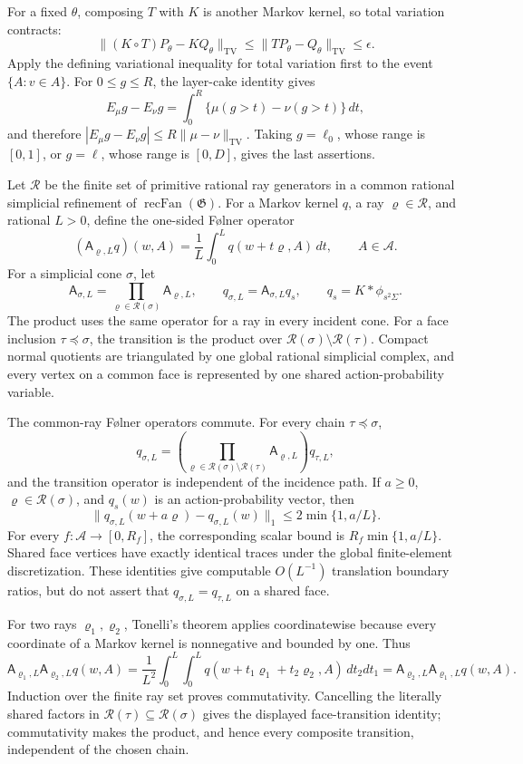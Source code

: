 For a fixed \(\theta\), composing \(T\) with \(K\) is another Markov kernel, so total variation contracts:
\[
 \|(K\circ T)P_\theta-KQ_\theta\|_{\mathrm{TV}}
 \le \|TP_\theta-Q_\theta\|_{\mathrm{TV}}\le\epsilon.
\]
Apply the defining variational inequality for total variation first to the event \(\{A:v\in A\}\). For \(0\le g\le R\), the layer-cake identity gives
\[
 E_\mu g-E_\nu g
 =\int_0^R\{\mu(g>t)-\nu(g>t)\}\,dt,
\]
and therefore \(|E_\mu g-E_\nu g|\le R\|\mu-\nu\|_{\mathrm{TV}}\). Taking \(g=\ell_0\), whose range is \([0,1]\), or \(g=\ell\), whose range is \([0,D]\), gives the last assertions.

Let \(\mathscr R\) be the finite set of primitive rational ray generators in a common rational simplicial refinement of \(\operatorname{recFan}(\mathfrak G)\). For a Markov kernel \(q\), a ray \(\varrho\in\mathscr R\), and rational \(L>0\), define the one-sided Følner operator
\[
 (\mathsf A_{\varrho,L}q)(w,A)
 =\frac1L\int_0^Lq(w+t\varrho,A)\,dt,
 \qquad A\in\mathcal A.
\]
For a simplicial cone \(\sigma\), let
\[
 \mathsf A_{\sigma,L}=\prod_{\varrho\in\mathscr R(\sigma)}
 \mathsf A_{\varrho,L},
 \qquad q_{\sigma,L}=\mathsf A_{\sigma,L}q_s,
 \qquad q_s=K*\phi_{s^2\Sigma}.
\]
The product uses the same operator for a ray in every incident cone. For a face inclusion \(\tau\preceq\sigma\), the transition is the product over \(\mathscr R(\sigma)\setminus\mathscr R(\tau)\). Compact normal quotients are triangulated by one global rational simplicial complex, and every vertex on a common face is represented by one shared action-probability variable.

The common-ray Følner operators commute. For every chain \(\tau\preceq\sigma\),
\[
 q_{\sigma,L}
 =\left(\prod_{\varrho\in\mathscr R(\sigma)\setminus\mathscr R(\tau)}
 \mathsf A_{\varrho,L}\right)q_{\tau,L},
\]
and the transition operator is independent of the incidence path. If \(a\ge0\), \(\varrho\in\mathscr R(\sigma)\), and \(q_s(w)\) is an action-probability vector, then
\[
 \|q_{\sigma,L}(w+a\varrho)-q_{\sigma,L}(w)\|_1
 \le 2\min\{1,a/L\}.
\]
For every \(f:\mathcal A\to[0,R_f]\), the corresponding scalar bound is \(R_f\min\{1,a/L\}\). Shared face vertices have exactly identical traces under the global finite-element discretization. These identities give computable \(O(L^{-1})\) translation boundary ratios, but do not assert that \(q_{\sigma,L}=q_{\tau,L}\) on a shared face.

For two rays \(\varrho_1,\varrho_2\), Tonelli's theorem applies coordinatewise because every coordinate of a Markov kernel is nonnegative and bounded by one. Thus
\[
 \mathsf A_{\varrho_1,L}\mathsf A_{\varrho_2,L}q(w,A)
 =\frac1{L^2}\int_0^L\int_0^L
 q(w+t_1\varrho_1+t_2\varrho_2,A)\,dt_2dt_1
 =\mathsf A_{\varrho_2,L}\mathsf A_{\varrho_1,L}q(w,A).
\]
Induction over the finite ray set proves commutativity. Cancelling the literally shared factors in \(\mathscr R(\tau)\subseteq\mathscr R(\sigma)\) gives the displayed face-transition identity; commutativity makes the product, and hence every composite transition, independent of the chosen chain.

